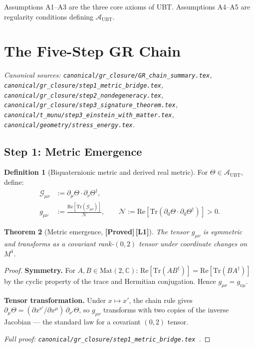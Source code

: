 \documentclass[12pt,a4paper]{article}
\newtheorem{theorem}{Theorem}[section]
\theoremstyle{definition}
\newtheorem{definition}[theorem]{Definition}
\theoremstyle{remark}
\newcommand{\PROVED}{\textbf{[Proved]}}
\newcommand{\Lone}{\textbf{[L1]}}
\newcommand{\CC}{\mathbb{C}}
\newcommand{\Tr}{\mathrm{Tr}}
\newcommand{\re}{\mathrm{Re}}
\newcommand{\calA}{\mathcal{A}}
\newcommand{\calG}{\mathcal{G}}
\newcommand{\calN}{\mathcal{N}}
\begin{document}
Assumptions A1--A3 are the three core axioms of UBT.
Assumptions A4--A5 are regularity conditions defining $\calA_{\mathrm{UBT}}$.

\section{The Five-Step GR Chain}
\label{sec:chain}

\noindent\textit{Canonical sources:
\texttt{canonical/gr\_closure/GR\_chain\_summary.tex},
\texttt{canonical/gr\_closure/step1\_metric\_bridge.tex},
\texttt{canonical/gr\_closure/step2\_nondegeneracy.tex},
\texttt{canonical/gr\_closure/step3\_signature\_theorem.tex},
\texttt{canonical/t\_munu/step3\_einstein\_with\_matter.tex},
\texttt{canonical/geometry/stress\_energy.tex}.}

\subsection{Step 1: Metric Emergence}
\label{sec:step1}

\begin{definition}[Biquaternionic metric and derived real metric]
\label{def:metric}
For $\Theta \in \calA_{\mathrm{UBT}}$, define:
\begin{align}
  \calG_{\mu\nu} &:= \partial_\mu\Theta \cdot \partial_\nu\Theta^\dagger, \\
  g_{\mu\nu} &:= \frac{\re[\Tr(\calG_{\mu\nu})]}{\calN},
  \qquad
  \calN := \re[\Tr(\partial_0\Theta \cdot \partial_0\Theta^\dagger)] > 0.
\end{align}
\end{definition}

\begin{theorem}[Metric emergence, \PROVED\,\Lone]
\label{thm:metric}
The tensor $g_{\mu\nu}$ is symmetric and transforms as a covariant
rank-$(0,2)$ tensor under coordinate changes on $M^4$.
\end{theorem}

\begin{proof}
\textbf{Symmetry.}
For $A,B \in \mathrm{Mat}(2,\CC)$:
$\re[\Tr(AB^\dagger)] = \re[\Tr(BA^\dagger)]$
by the cyclic property of the trace and Hermitian conjugation.
Hence $g_{\mu\nu} = g_{\nu\mu}$.

\textbf{Tensor transformation.}
Under $x \mapsto x'$, the chain rule gives
$\partial_\mu\Theta = (\partial x^{\nu'}/\partial x^\mu)\,\partial_{\nu'}\Theta$,
so $g_{\mu\nu}$ transforms with two copies of the inverse Jacobian —
the standard law for a covariant $(0,2)$ tensor.

\medskip
\noindent\textit{Full proof:
\texttt{canonical/gr\_closure/step1\_metric\_bridge.tex}~\cite{jaros2026_canonical}.}
\end{proof}
\end{document}
